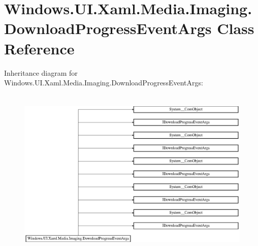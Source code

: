 \hypertarget{class_windows_1_1_u_i_1_1_xaml_1_1_media_1_1_imaging_1_1_download_progress_event_args}{}\section{Windows.\+U\+I.\+Xaml.\+Media.\+Imaging.\+Download\+Progress\+Event\+Args Class Reference}
\label{class_windows_1_1_u_i_1_1_xaml_1_1_media_1_1_imaging_1_1_download_progress_event_args}
Inheritance diagram for Windows.\+U\+I.\+Xaml.\+Media.\+Imaging.\+Download\+Progress\+Event\+Args\+:\begin{figure}[H]
\begin{center}
\leavevmode
\includegraphics[height=8.257373cm]{class_windows_1_1_u_i_1_1_xaml_1_1_media_1_1_imaging_1_1_download_progress_event_args}
\end{center}
\end{figure}
